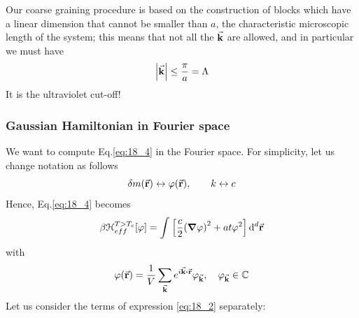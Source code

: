 \documentclass[../main/main.tex]{subfiles}
\begin{document}
\begin{remark}
Our coarse graining procedure is based on the construction of blocks which have a linear dimension that cannot be smaller than \( a \), the characteristic microscopic length of the system; this means that not all the \( \va{k} \)  are allowed, and in particular we must have
\begin{equation*}
\abs{\va{k}} \le \frac{\pi }{a} = \Lambda
\end{equation*}
It is the ultraviolet cut-off!
\end{remark}



\subsubsection{Gaussian Hamiltonian in Fourier space}
We want to compute Eq.\eqref{eq:18_4}  in the Fourier space. For simplicity, let us change notation as follows
\begin{equation*}
  \delta m (\va{r}) \leftrightarrow \varphi (\va{r}), \qquad k \leftrightarrow c
\end{equation*}
Hence, Eq.\eqref{eq:18_4} becomes
\begin{equation}
  \beta \mathcal{H}_{eff}^{T>T_c} [\varphi ]= \int_{}^{}  \qty[\frac{c}{2} \qty(\grad \varphi )^2 + a t \varphi  ^2 ] \dd[d]{\va{r}}
  \label{eq:18_2}
\end{equation}
with
\begin{equation*}
  \varphi (\va{r}) = \frac{1}{V} \sum_{\va{k}}^{} e^{i \va{k} \vdot \va{r}} \varphi _{\va{k}}, \quad \varphi _{\va{k}} \in \mathbb{C}
\end{equation*}
Let us consider the terms of expression \eqref{eq:18_2} separately:
\end{document}
